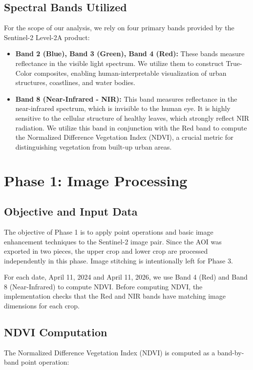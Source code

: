 \documentclass[12pt,a4paper]{article}
\begin{document}
\subsection{Spectral Bands Utilized}
For the scope of our analysis, we rely on four primary bands provided by the Sentinel-2 Level-2A product:
\begin{itemize}
    \item \textbf{Band 2 (Blue), Band 3 (Green), Band 4 (Red):} These bands measure reflectance in the visible light spectrum. We utilize them to construct True-Color composites, enabling human-interpretable visualization of urban structures, coastlines, and water bodies.
    \item \textbf{Band 8 (Near-Infrared - NIR):} This band measures reflectance in the near-infrared spectrum, which is invisible to the human eye. It is highly sensitive to the cellular structure of healthy leaves, which strongly reflect NIR radiation. We utilize this band in conjunction with the Red band to compute the Normalized Difference Vegetation Index (NDVI), a crucial metric for distinguishing vegetation from built-up urban areas.
\end{itemize}

\section{Phase 1: Image Processing}

\subsection{Objective and Input Data}
The objective of Phase 1 is to apply point operations and basic image enhancement techniques to the Sentinel-2 image pair. Since the AOI was exported in two pieces, the upper crop and lower crop are processed independently in this phase. Image stitching is intentionally left for Phase 3.

For each date, April 11, 2024 and April 11, 2026, we use Band 4 (Red) and Band 8 (Near-Infrared) to compute NDVI. Before computing NDVI, the implementation checks that the Red and NIR bands have matching image dimensions for each crop.

\subsection{NDVI Computation}
The Normalized Difference Vegetation Index (NDVI) is computed as a band-by-band point operation:
\end{document}
